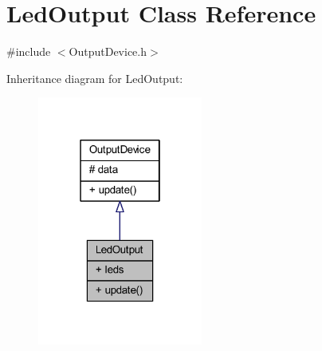 \hypertarget{class_led_output}{}\section{Led\+Output Class Reference}
\label{class_led_output}


{\ttfamily \#include $<$Output\+Device.\+h$>$}



Inheritance diagram for Led\+Output\+:
\nopagebreak
\begin{figure}[H]
\begin{center}
\leavevmode
\includegraphics[width=154pt]{class_led_output__inherit__graph}
\end{center}
\end{figure}


